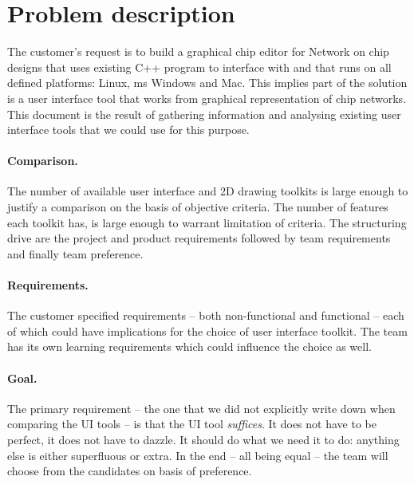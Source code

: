 \section{Problem description}
The customer's request is to build a graphical chip editor for Network on chip designs
that uses existing C++ program to interface with and that runs on all defined
platforms: Linux, ms Windows and Mac. This implies part of the solution is a
user interface tool that works from graphical representation of chip networks.
This document is the result of gathering information and analysing existing
user interface tools that we could use for this purpose.

\paragraph{Comparison.} The number of available user interface and 2D drawing toolkits
is large enough to justify a comparison on the basis of objective criteria. The number
of features each toolkit has, is large enough to warrant limitation of criteria. The
structuring drive are the project and product requirements followed by team requirements
and finally team preference.

\paragraph{Requirements.} The customer specified requirements -- both non-functional and
functional -- each of which could have implications for the
choice of user interface toolkit. The team has its own learning requirements which
could influence the choice as well.

\paragraph{Goal.} The primary requirement -- the one that we did not explicitly
write down when comparing the UI tools -- is that the UI tool \emph{suffices}.
It does not have to be perfect, it does not have to dazzle. It should do what we
need it to do: anything else is either superfluous or extra. In the end -- all being
equal -- the team will choose from the candidates on basis of preference.



